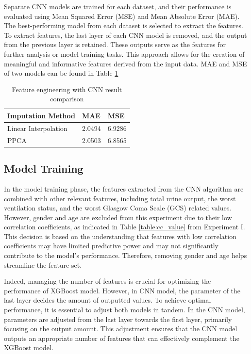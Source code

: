 \documentclass[12pt,a4paper,english
]{tunithesis}
\begin{document}
Separate CNN models are trained for each dataset, and their performance is evaluated using Mean Squared Error (MSE) and Mean Absolute Error (MAE). The best-performing model from each dataset is selected to extract the features. To extract features, the last layer of each CNN model is removed, and the output from the previous layer is retained. These outputs serve as the features for further analysis or model training tasks. This approach allows for the creation of meaningful and informative features derived from the input data. MAE and MSE of two models can be found in Table \ref{table:cnn_result_comparison}

\begin{table}[ht]
\centering
    \caption{Feature engineering with CNN result comparison}
    \label{table:cnn_result_comparison}
    \begin{tabular}{|l|l|l|}
        \hline
        \textbf{Imputation Method} & \textbf{MAE} & \textbf{MSE} \\ \hline
        Linear Interpolation & 2.0494 & 6.9286 \\ \hline
        PPCA & 2.0503 & 6.8565 \\ \hline
    \end{tabular}
\end{table}

\subsection{Model Training}

In the model training phase, the features extracted from the CNN algorithm are combined with other relevant features, including total urine output, the worst ventilation status, and the worst Glasgow Coma Scale (GCS) related values. However, gender and age are excluded from this experiment due to their low correlation coefficients, as indicated in Table \ref{table:cc_value} from Experiment I. This decision is based on the understanding that features with low correlation coefficients may have limited predictive power and may not significantly contribute to the model's performance. Therefore, removing gender and age helps streamline the feature set.

Indeed, managing the number of features is crucial for optimizing the performance of XGBoost model. However, in CNN model, the parameter of the last layer decides the amount of outputted values. To achieve optimal performance, it is essential to adjust both models in tandem. In the CNN model, parameters are adjusted from the last layer towards the first layer, primarily focusing on the output amount. This adjustment ensures that the CNN model outputs an appropriate number of features that can effectively complement the XGBoost model.
\end{document}

